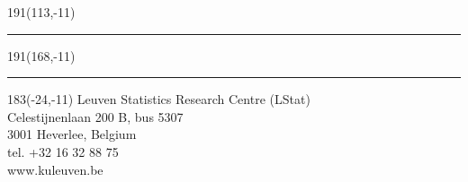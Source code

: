 \documentclass[12pt,a4paper]{book}
\begin{document}


\tableofcontents
\thispagestyle{empty}




\newpage
\setcounter{page}{0}








\newpage
\listoffigures
\listoftables

{}




\newpage
\thispagestyle{empty}
\sffamily
%
\begin{textblock}{191}(113,-11)
{\color{blueline}\rule{160pt}{5.5pt}}
\end{textblock}
%
\begin{textblock}{191}(168,-11)
{\color{blueline}\rule{5.5pt}{59pt}}
\end{textblock}
%
\begin{textblock}{183}(-24,-11)
\textblockcolour{}
\flushright
\fontsize{7}{7.5}\selectfont
Leuven Statistics Research Centre (LStat) \\
Celestijnenlaan 200 B, bus 5307 \\
3001 Heverlee, Belgium\\
tel. +32 16 32 88 75 \\
www.kuleuven.be\\
\end{textblock}
%
\end{document}
